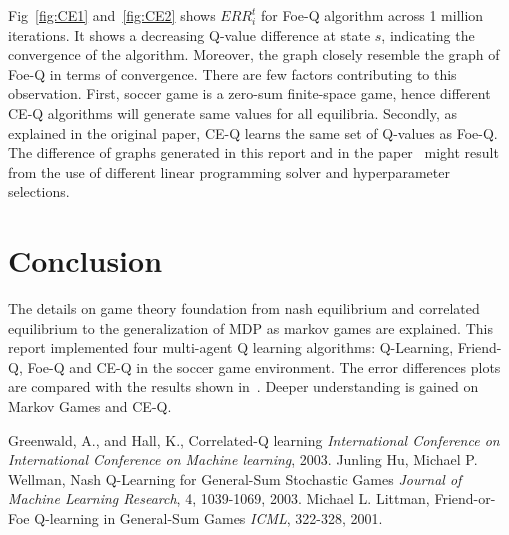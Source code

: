 \documentclass[conference]{IEEEtran}
\begin{document}
Fig~\ref{fig:CE1} and~\ref{fig:CE2} shows $ERR_i^t$ for Foe-Q algorithm across 1 million iterations. It shows a decreasing Q-value difference at state $s$, indicating the convergence of the algorithm. Moreover, the graph closely resemble the graph of Foe-Q in terms of convergence. There are few factors contributing to this observation. First, soccer game is a zero-sum finite-space game, hence different CE-Q algorithms will generate same values for all equilibria. Secondly, as explained in the original paper, CE-Q learns the same set of Q-values as Foe-Q. The difference of graphs generated in this report and in the paper~\cite{b1} might result from the use of different linear programming solver and hyperparameter selections.

\section{Conclusion}

The details on game theory foundation from nash equilibrium and correlated equilibrium to the generalization of MDP as markov games are explained. This report implemented four multi-agent Q learning algorithms: Q-Learning, Friend-Q, Foe-Q and CE-Q in the soccer game environment. The error differences plots are compared with the results shown in~\cite{b1}. Deeper understanding is gained on Markov Games and CE-Q.

\begin{thebibliography}{00}{}
 Greenwald, A., and Hall, K., Correlated-Q learning \textit{International Conference on International Conference on Machine learning}, 2003.
 Junling Hu, Michael P. Wellman, Nash Q-Learning for General-Sum Stochastic Games \textit{Journal of Machine Learning Research}, 4, 1039-1069, 2003.
 Michael L. Littman, Friend-or-Foe Q-learning in General-Sum Games \textit{ICML}, 322-328, 2001.
\end{thebibliography}
\vspace{12pt}
\end{document}
